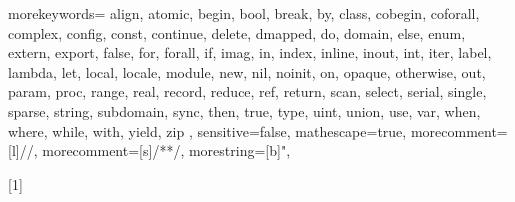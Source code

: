   {
    morekeywords={
      align, atomic,
      begin, bool, break, by,
      class, cobegin, coforall, complex, config, const, continue,
      delete, dmapped, do, domain,
      else, enum, extern, export,
      false, for, forall,
      if, imag, in, index, inline, inout, int, iter,
      label, lambda, let, local, locale,
      module,
      new, nil, noinit,
      on, opaque, otherwise, out,
      param, proc,
      range, real, record, reduce, ref, return,
      scan, select, serial, single, sparse, string, subdomain, sync,
      then, true, type,
      uint, union, use,
      var,
      when, where, while, with,
      yield,
      zip
    },
    sensitive=false,
    mathescape=true,
    morecomment=[l]{//},
    morecomment=[s]{/*}{*/},
    morestring=[b]",
}


\newcommand{\chpl}[1]{\lstinline[language=chapel,basicstyle=\small\ttfamily,keywordstyle=]!#1!}
\newcommand{\varname}[1]{\emph{#1}}
\newcommand{\typename}[1]{\emph{#1}}
\newcommand{\fnname}[1]{\chpl{#1}}




[1]
  {\lstset{language=chapel,xleftmargin=2pc,stepnumber=0,keywordstyle=}}{}



\newenvironment{protobody}{\begin{description}\item[\quad\quad] }{\end{description}}
